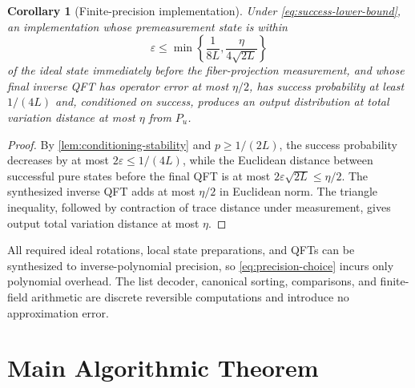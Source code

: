 \documentclass[11pt,letterpaper]{article}
\newtheorem{corollary}[theorem]{Corollary}
\theoremstyle{definition}
\begin{document}
\begin{corollary}[Finite-precision implementation]
\label{cor:finite-precision}
Under \cref{eq:success-lower-bound}, an implementation whose premeasurement state is within
\begin{equation}
   \varepsilon\le
   \min\left\{\frac1{8L},\frac{\eta}{4\sqrt{2L}}\right\}
   \label{eq:precision-choice}
\end{equation}
of the ideal state immediately before the fiber-projection measurement, and whose final inverse QFT has operator error at most $\eta/2$, has success probability at least $1/(4L)$ and, conditioned on success, produces an output distribution at total variation distance at most $\eta$ from $P_u$.
\end{corollary}

\begin{proof}
By \cref{lem:conditioning-stability} and $p\ge1/(2L)$, the success probability decreases by at most $2\varepsilon\le1/(4L)$, while the Euclidean distance between successful pure states before the final QFT is at most $2\varepsilon\sqrt{2L}\le\eta/2$.  The synthesized inverse QFT adds at most $\eta/2$ in Euclidean norm.  The triangle inequality, followed by contraction of trace distance under measurement, gives output total variation distance at most $\eta$.
\end{proof}

All required ideal rotations, local state preparations, and QFTs can be synthesized to inverse-polynomial precision, so \cref{eq:precision-choice} incurs only polynomial overhead.  The list decoder, canonical sorting, comparisons, and finite-field arithmetic are discrete reversible computations and introduce no approximation error.

\section{Main Algorithmic Theorem}
\end{document}
